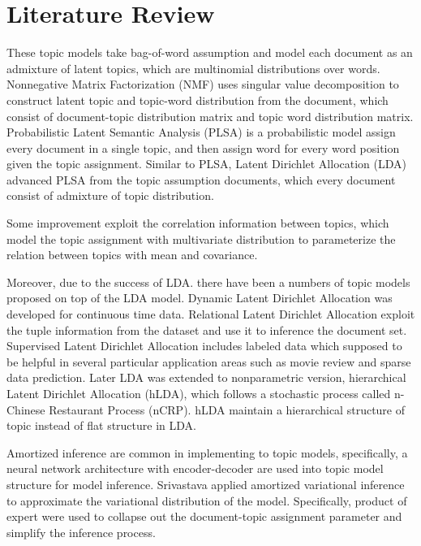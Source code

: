 \section{Literature Review}\label{ch1:3}
These topic models take bag-of-word assumption and model each document as an admixture of latent topics, which are multinomial distributions over words.
Nonnegative Matrix Factorization (NMF) \cite{lee_learning_1999} uses singular value decomposition to construct latent topic and topic-word distribution from the document, which consist of document-topic distribution matrix and topic word distribution matrix.
Probabilistic Latent Semantic Analysis (PLSA) \cite{hofmann_probabilistic_2013} is a probabilistic model assign every document in a single topic, and then assign word for every word position given the topic assignment.
Similar to PLSA, Latent Dirichlet Allocation (LDA) \cite{blei_latent_2003} advanced PLSA from the topic assumption documents, which every document consist of admixture of topic distribution.

Some improvement exploit the correlation information between topics, which model the topic assignment with multivariate distribution to parameterize the relation between topics with mean and covariance.

Moreover, due to the success of LDA. there have been a numbers of topic models proposed on top of the LDA model. Dynamic Latent Dirichlet Allocation\cite{blei_probabilistic_2012} was developed for continuous time data. Relational Latent Dirichlet Allocation \cite{chang_relational_2009} exploit the tuple information from the dataset and use it to inference the document set. Supervised Latent Dirichlet Allocation \cite{mcauliffe_supervised_2008} includes labeled data which supposed to be helpful in several particular application areas such as movie review and sparse data prediction. Later LDA was extended to nonparametric version, hierarchical Latent Dirichlet Allocation (hLDA)\cite{teh_hierarchical_2006}, which follows a stochastic process called n-Chinese Restaurant Process (nCRP)\cite{teh_tutorial_2007}. hLDA maintain a hierarchical structure of topic instead of flat structure in LDA. %

Amortized inference\cite{kingma_auto-encoding_2014} are common in implementing to topic models, specifically, a neural network architecture with encoder-decoder are used into topic model structure for model inference.
Srivastava\cite{srivastava_autoencoding_2017} applied amortized variational inference to approximate the variational distribution of the model. Specifically, product of expert were used to collapse out the document-topic assignment parameter and simplify the inference process.

